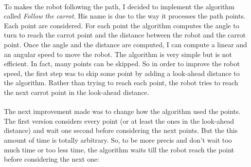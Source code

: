 \paragraph{}{
    To makes the robot following the path, I decided to implement the
algorithm called \textit{Follow the carrot}\cite{thesis:barton}. His name is
due to the way it processes the path points. Each point are considered. 
For each point the algorithm computes the angle to turn to reach the carrot
point and the distance between the robot and the carrot point. Once the
angle and the distance are computed, I can compute a linear and an angular
speed to move the robot. The algorithm is very simple but is not efficient.
In fact, many points can be skipped. So in order to improve the robot speed,
the first step was to skip some point by adding a look-ahead distance to the
algorithm. Rather than trying to reach each point, the robot tries to reach
the next carrot point in the look-ahead distance.
}

\paragraph{}{
    The next improvement made was to change how the algorithm used the
points. The first version considers every point (or at least the ones in the
look-ahead distance) and wait one second before considering the next points.
But the this amount of time is totally arbitrary. So, to be more precis and
don't wait too much time or too less time, the algorithm waits till the robot
reach the point before considering the next one:
}

